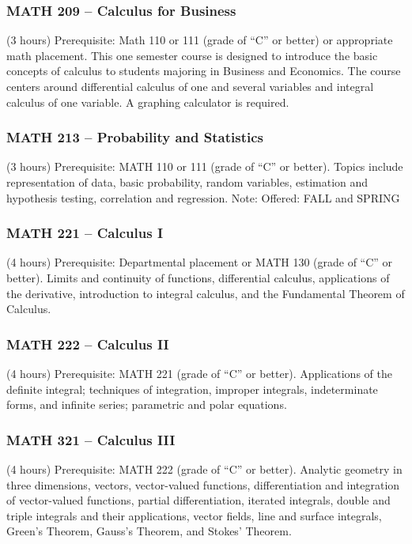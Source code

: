 \subsubsection{MATH 209 -- Calculus for Business}%
\label{course:MATH:209}
(3 hours) Prerequisite: Math 110 or 111 (grade of “C” or better) or appropriate math placement. This one semester course is designed to introduce the basic concepts of calculus to students majoring in Business and Economics. The course centers around differential calculus of one and several variables and integral calculus of one variable. A graphing calculator is required.

\subsubsection{MATH 213 -- Probability and Statistics}%
\label{course:MATH:213}
(3 hours) Prerequisite: MATH 110 or 111 (grade of “C” or better). Topics include representation of data, basic probability, random variables, estimation and hypothesis testing, correlation and regression. Note: Offered: FALL and SPRING

\subsubsection{MATH 221 -- Calculus I}%
\label{course:MATH:221}
(4 hours) Prerequisite: Departmental placement or MATH 130 (grade of “C” or better). Limits and continuity of functions, differential calculus, applications of the derivative, introduction to integral calculus, and the Fundamental Theorem of Calculus.

\subsubsection{MATH 222 -- Calculus II}%
\label{course:MATH:222}
(4 hours) Prerequisite: MATH 221 (grade of “C” or better). Applications of the definite integral; techniques of integration, improper integrals, indeterminate forms, and infinite series; parametric and polar equations.

\subsubsection{MATH 321 -- Calculus III}%
\label{course:MATH:321}
(4 hours) Prerequisite: MATH 222 (grade of “C” or better). Analytic geometry in three dimensions, vectors, vector-valued functions, differentiation and integration of vector-valued functions, partial differentiation, iterated integrals, double and triple integrals and their applications, vector fields, line and surface integrals, Green’s Theorem, Gauss’s Theorem, and Stokes’ Theorem.

